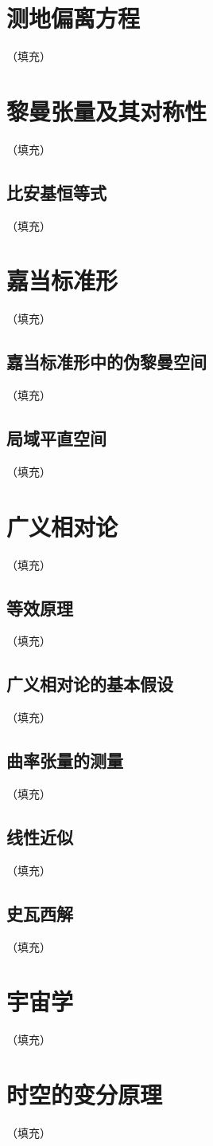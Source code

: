 \documentclass[hyperref,UTF8]{ctexbook}
\begin{document}
\section{测地偏离方程}（填充）
\section{黎曼张量及其对称性}（填充）
\subsection{比安基恒等式}（填充）
\section{嘉当标准形}（填充）
\subsection{嘉当标准形中的伪黎曼空间}（填充）
\subsection{局域平直空间}（填充）
\section{广义相对论}（填充）
\subsection{等效原理}（填充）
\subsection{广义相对论的基本假设}（填充）
\subsection{曲率张量的测量}（填充）
\subsection{线性近似}（填充）
\subsection{史瓦西解}（填充）
\section{宇宙学}（填充）
\section{时空的变分原理}（填充）
\end{document}
